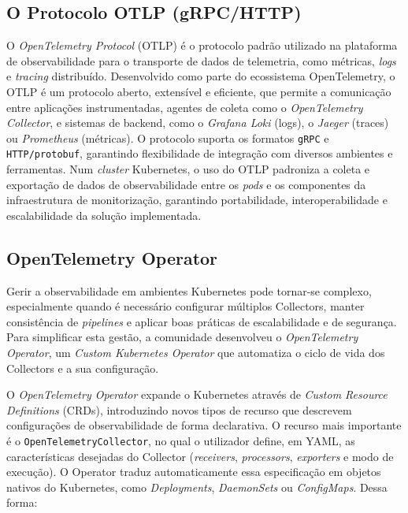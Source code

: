 \subsection{O Protocolo OTLP (gRPC/HTTP)}

O \textit{OpenTelemetry Protocol} (OTLP) é o protocolo padrão utilizado na plataforma de observabilidade para o transporte de dados de telemetria, como métricas, \textit{logs} e \textit{tracing} distribuído. Desenvolvido como parte do ecossistema OpenTelemetry, o OTLP é um protocolo aberto, extensível e eficiente, que permite a comunicação entre aplicações instrumentadas, agentes de coleta como o \textit{OpenTelemetry Collector}, e sistemas de backend, como o \textit{Grafana Loki} (logs), o \textit{Jaeger} (traces) ou \textit{Prometheus} (métricas). O protocolo suporta os formatos \texttt{gRPC} e \texttt{HTTP/protobuf}, garantindo flexibilidade de integração com diversos ambientes e ferramentas. Num \textit{cluster} Kubernetes, o uso do OTLP padroniza a coleta e exportação de dados de observabilidade entre os \textit{pods} e os componentes da infraestrutura de monitorização, garantindo portabilidade, interoperabilidade e escalabilidade da solução implementada.

\subsection{OpenTelemetry Operator}

Gerir a observabilidade em ambientes Kubernetes pode tornar-se complexo, especialmente quando é necessário configurar múltiplos Collectors, manter consistência de \textit{pipelines} e aplicar boas práticas de escalabilidade e de segurança. Para simplificar esta gestão, a comunidade desenvolveu o \textit{OpenTelemetry Operator}, um \textit{Custom Kubernetes Operator} que automatiza o ciclo de vida dos Collectors e a sua configuração.

O \textit{OpenTelemetry Operator} expande o Kubernetes através de \textit{Custom Resource Definitions} (CRDs), introduzindo novos tipos de recurso que descrevem configurações de observabilidade de forma declarativa. O recurso mais importante é o \texttt{OpenTelemetryCollector}, no qual o utilizador define, em YAML, as características desejadas do Collector (\textit{receivers}, \textit{processors}, \textit{exporters} e modo de execução). O Operator traduz automaticamente essa especificação em objetos nativos do Kubernetes, como \textit{Deployments}, \textit{DaemonSets} ou \textit{ConfigMaps}. Dessa forma:

